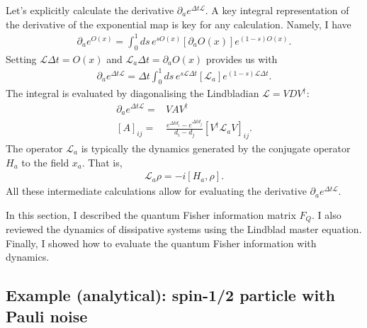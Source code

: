 \documentclass[12pt]{article}
\begin{document}
Let's explicitly calculate the derivative $ \partial_a e^{\Delta t \mathcal{L}}$. A key integral representation of the derivative of the exponential map is key for any calculation. Namely, I have
\begin{align}
    \partial_a e^{O(x)} = \int_0^1 ds\, e^{s O(x)}\left[\partial_a O(x)\right]e^{(1-s) O(x)}.
\end{align}
Setting $\mathcal{L} \Delta t = O(x)$ and $\mathcal{L}_a \Delta t = \partial_a O(x)$ provides us with
\begin{align}
    \partial_a e^{\Delta t \mathcal{L}} = \Delta t \int_0^1 ds\, e^{s \mathcal{L} \Delta t}\left[\mathcal{L}_a\right]e^{(1-s) \mathcal{L} \Delta t}.
\end{align}
The integral is evaluated by diagonalising the Lindbladian $\mathcal{L} = V D V^\dagger$:
\begin{align}
    \partial_a e^{\Delta t \mathcal{L}} = & V A V^\dagger\\
   [A]_{ij} = & \frac{e^{\Delta t d_i} - e^{\Delta t d_j}}{d_i - d_j}\left[V^\dagger \mathcal{L}_a V\right]_{ij}.
\end{align}
The operator $\mathcal{L}_a$ is typically the dynamics generated by the conjugate operator $H_a$ to the field $x_a$. That is,
\begin{align}
    \mathcal{L}_a \rho = - i [H_a, \rho].
\end{align}
All these intermediate calculations allow for evaluating the derivative $\partial_a e^{\Delta t \mathcal{L}}$. 

In this section, I described the quantum Fisher information matrix $F_Q$. I also reviewed the dynamics of dissipative systems using the Lindblad master equation. Finally, I showed how to evaluate the quantum Fisher information with dynamics.

\subsection{Example (analytical): spin-1/2 particle with Pauli noise}
\end{document}
